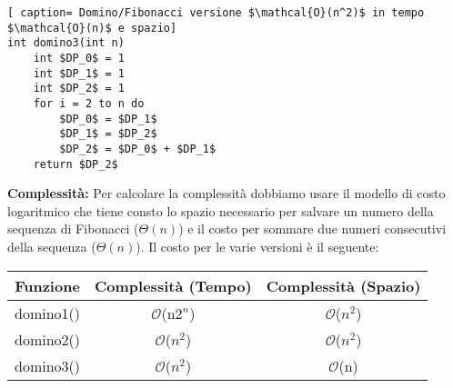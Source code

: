 \documentclass[../cheatSheetAlgoritmi.tex]{subfiles}
\begin{document}
\begin{lstlisting}[ caption= Domino/Fibonacci versione $\mathcal{O}(n^2)$ in tempo $\mathcal{O}(n)$ e spazio]
int domino3(int n)
	int $DP_0$ = 1
	int $DP_1$ = 1
	int $DP_2$ = 1
	for i = 2 to n do
		$DP_0$ = $DP_1$
		$DP_1$ = $DP_2$
		$DP_2$ = $DP_0$ + $DP_1$
	return $DP_2$
\end{lstlisting}
\textbf{Complessità:} Per calcolare la complessità dobbiamo usare il modello di costo logaritmico che tiene consto lo spazio necessario per salvare un numero della sequenza di Fibonacci ($\Theta(n)$) e il costo per sommare due numeri consecutivi della sequenza ($\Theta(n)$). 
Il costo per le varie versioni è il seguente: 
\begin{center}
	\renewcommand{\arraystretch}{1.2}
	\begin{tabular}{ |c|c|c| } 
		\hline
			Funzione & Complessità (Tempo) & Complessità (Spazio)\\ 
		\hline
			domino1() & $\mathcal{O}$(n$2^{n}$) &  $\mathcal{O}$($n^{2}$)\\ 
		\hline
			domino2() &  $\mathcal{O}$($n^{2}$) &  $\mathcal{O}$($n^{2}$) \\
		\hline
			domino3() &  $\mathcal{O}$($n^{2}$) &  $\mathcal{O}$(n) \\
		\hline
	\end{tabular}
\end{center} \
\end{document}
